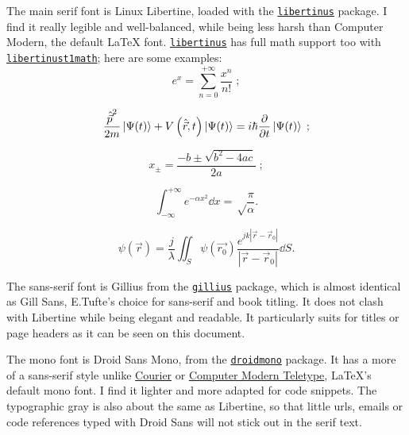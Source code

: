 \documentclass[
	raggedright,
	12pt,
	colorful,
]{tufte-style-article}
\begin{document}
The main serif font is Linux Libertine, loaded with the \href{www.ctan.org/pkg/libertinus}{\texttt{libertinus}} package. I find it really legible and well-balanced, while being less harsh than Computer Modern, the default \LaTeX{} font. \href{www.ctan.org/pkg/libertinus}{\texttt{libertinus}} has full math support too with \href{www.ctan.org/pkg/libertinust1math}{\texttt{libertinust1math}}; here are some examples:
$$
e^x = \sum_{n=0}^{+\infty} \frac{x^n}{n!} \;;
$$

$$
\frac{{\hat{\vec p}}^2}{2m}\ket{\Psi(t)} + V\left(\hat{\vec r},t\right)\ket{\Psi(t)} = i\hbar \pdv{}{t}\ket{\Psi(t)} \;;
$$

$$
x_\pm = \frac{-b \pm \sqrt{b^2 - 4ac}}{2a}\;;
$$

$$
\int_{-\infty}^{+\infty} e^{-\alpha x^2} \dd{x} = \sqrt\frac{\pi}{\alpha}.
$$

\begin{equation}
\psi(\vec r) = \frac{j}{\lambda} \iint_S \psi(\vec{r_0})\frac{e^{jk|\vec r - \vec r_0|}}{|\vec r - \vec r_0|}\dd S.
\end{equation}

\begingroup\sffamily
The sans-serif font is Gillius from the \href{www.ctan.org/pkg/gillius}{\texttt{gillius}} package, which is almost identical as Gill Sans, E.Tufte's choice for sans-serif and book titling. It does not clash with Libertine while being elegant and readable. It particularly suits for titles or page headers as it can be seen on this document.
\endgroup

\begingroup\ttfamily
The mono font is Droid Sans Mono, from the \href{www.ctan.org/pkg/droid}{\texttt{droidmono}} package. It has a more of a sans-serif style unlike \href{www.ctan.org/tex-archive/fonts/psfonts/psnfss-source/courier}{Courier} or \href{www.ctan.org/tex-archive/fonts/cm/}{Computer Modern Teletype}, \LaTeX{}'s default mono font. I find it lighter and more adapted for code snippets. The typographic gray is also about the same as Libertine, so that little urls, emails or code references typed with Droid Sans will not stick out in the serif text.
\endgroup
\end{document}
